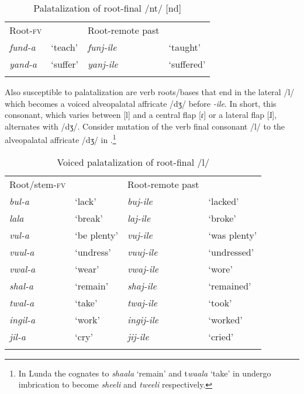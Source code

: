 \documentclass[output=paper]{langsci/langscibook}
\begin{document}
\begin{table}
\begin{tabular}{llll}
\lsptoprule
Root-\textsc{fv} &  & Root-remote past & \\
\textit{fund-a} & `teach' & \textit{funj-ile} & `taught' \\
\textit{yand-a} & `suffer' & \textit{yanj-ile} & `suffered' \\

\lspbottomrule
\end{tabular}

\caption{Palatalization of root-final /nt/ [nd]}
\label{tab:11.kawasha}

 \end{table}


Also susceptible to palatalization are verb roots/bases that end in the lateral /l/ which becomes a voiced alveopalatal affricate /dʒ/ before \textit{-ile}. In short, this consonant, which varies between [l] and a central flap [ɾ] or a lateral flap [ɺ], alternates with /dʒ/. Consider mutation of the verb final consonant /l/ to the alveopalatal affricate /dʒ/ in .\footnote{In Lunda the cognates to \textit{shaala} ‘remain’ and t\textit{waala }‘take’ in  undergo imbrication to become \textit{sheeli} and \textit{tweeli} respectively.}


\begin{table}
\begin{tabular}{llll}
\lsptoprule
Root/stem-\textsc{fv} &  & Root-remote past & \\
\textit{bul-a} & `lack' & \textit{buj-ile} & `lacked' \\
\textit{lala} & `break' & \textit{laj-ile} & `broke' \\
\textit{vul-a} & `be plenty' & \textit{vuj-ile} & `was plenty' \\
\textit{vuul-a} & `undress' & \textit{vuuj-ile} & `undressed' \\
\textit{vwal-a} & `wear' & \textit{vwaj-ile} & `wore' \\
\textit{shal-a} & `remain' & \textit{shaj-ile} & `remained' \\
\textit{twal-a} & `take' & \textit{twaj-ile} & `took' \\
\textit{ingil-a} & `work' & \textit{ingij-ile} & `worked' \\
\textit{jil-a} & `cry' & \textit{jij-ile} & `cried' \\


\lspbottomrule
\end{tabular}

\caption{Voiced palatalization of root-final /l/}
\label{tab:12.kawasha}

\end{table}
\end{document}
